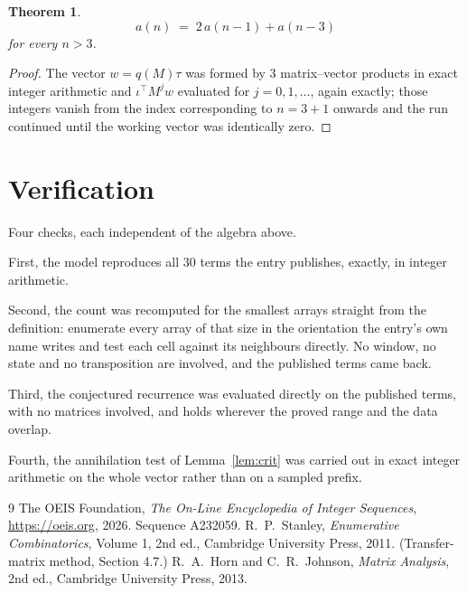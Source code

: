 \documentclass[11pt,a4paper]{article}
\theoremstyle{plain}
\newtheorem{theorem}{Theorem}
\theoremstyle{definition}
\begin{document}
\begin{theorem}
\[
a(n)\;=\;2\,a(n-1) + a(n-3)
\]
for every $n>3$.
\end{theorem}

\begin{proof}
The vector $w=q(M)\tau$ was formed by $3$ matrix--vector products in exact integer
arithmetic and $\iota^{\!\top}M^{j}w$ evaluated for $j=0,1,\dots$, again exactly; those
integers vanish from the index corresponding to $n=3+1$ onwards and the run continued
until the working vector was identically zero.
\end{proof}

\section{Verification}

Four checks, each independent of the algebra above.

First, the model reproduces all $30$ terms the entry publishes, exactly, in integer
arithmetic.

Second, the count was recomputed for the smallest arrays straight from the definition:
enumerate every array of that size in the orientation the entry's own name writes and test each
cell against its neighbours directly. No window, no state and no transposition are involved,
and the published terms came back.

Third, the conjectured recurrence was evaluated directly on the published terms, with no
matrices involved, and holds wherever the proved range and the data overlap.

Fourth, the annihilation test of Lemma~\ref{lem:crit} was carried out in exact integer
arithmetic on the whole vector rather than on a sampled prefix.

\begin{thebibliography}{9}
 The OEIS Foundation, \emph{The On-Line Encyclopedia of Integer
Sequences}, \url{https://oeis.org}, 2026. Sequence A232059.
 R.~P.~Stanley, \emph{Enumerative Combinatorics}, Volume 1, 2nd ed.,
Cambridge University Press, 2011. (Transfer-matrix method, Section 4.7.)
 R.~A.~Horn and C.~R.~Johnson, \emph{Matrix Analysis}, 2nd ed., Cambridge
University Press, 2013.
\end{thebibliography}
\end{document}
